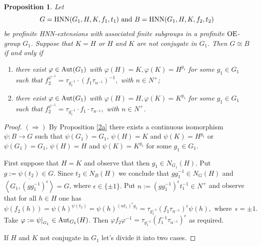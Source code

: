 \documentclass[a4paper,12pt]{article}
\newtheorem{prop}[thm]{Proposition}
\def\OE{{\rm OE}}
\def\aut {{\rm Aut}}
\def\hnn {{\rm HNN}}
\begin{document}
{\begin{prop}\label{nonnormalhnnprof} Let $$G= \hnn(G_1, H, K, f_1, t_1)\  {\rm and}\  B=\hnn(G_1, H, K, f_2, t_2)$$ be profinite HNN-extensions with associated finite subgroups in a profinite $\OE$-group $G_1$. Suppose that $K=H$ or $H$ and $K$ are not conjugate in $G_1$. Then $G\cong B$ if and only if 

\begin{enumerate}
\item [(i)] there exist $\varphi\in \aut(G_1)$ with $\varphi(H)=K, \varphi(K)=H^{g_1}$ for some $g_1 \in G_1$ such that $ f_2^{\varphi^{-1}} = \tau_{g_1^{-1}} \cdot  (f_1\tau_{n^{-1}})^{-1},$ with  $n\in N^{+}$;
\item [(ii)] there exist $\varphi\in \aut(G_1)$ with $\varphi(H)=H, \varphi(K)=K^{g_1}$ for some $g_1 \in G_1$ such that $f_2^{\varphi^{-1}} = \tau_{g_1^{-1}} \cdot f_1 \cdot \tau_{n^{-1}} ,$ with $n\in N^{+}$.
\end{enumerate}
\end{prop}

\begin{proof}

$(\Longrightarrow)$ By Proposition \ref{2a} there exists a continuous  isomorphism \break 
$\psi:B\longrightarrow G$ such that $\psi(G_1) = G_1$, $\psi(H)=K$ and $\psi(K)=H^{g_1}$ or  $\psi(G_1) = G_1$, $\psi(H)=H$ and $\psi(K)=K^{g_1}$ for some $g_1\in G_1$.  


First suppose that $H=K$ and observe that then $g_1\in N_{G_1}(H)$. Put $g:=\psi(t_2) \in G$. Since $t_2 \in N_{B}(H)$ we conclude that $gg_1^{-1} \in N_{G}(H)$ and $ 
 \overline{\left\langle  G_1, (gg_1^{-1})^{\epsilon} \right\rangle}=G$, where  $\epsilon \in \{\pm 1\}.$  %
Put $n:= (gg_1^{-1})^{\epsilon}t_1^{-1} \in N^{+}$ and observe that for all $h \in H$ one has $$\psi(f_2(h)) = \psi(h)^{\psi(t_2)} = \psi(h)^{(nt_1)^{\epsilon}g_1} =\tau_{g_1^{-1}}(f_1\tau_{n^{-1}})^{\epsilon} \psi(h), \mbox{ where } \, \epsilon = \pm 1.$$ 
Take $\varphi:=\psi|_{_{G_1}} \in \aut_{G_1}(H)$. Then $\varphi f_2\varphi^{-1}=  \tau_{g_1^{-1}}(f_1^{-1}\tau_{n^{-1}})^{\epsilon}$ as required. 

\bigskip
If $H$ and $K$ not conjugate in $G_1$ let's divide it into two cases. 


\end{proof}}
\end{document}
